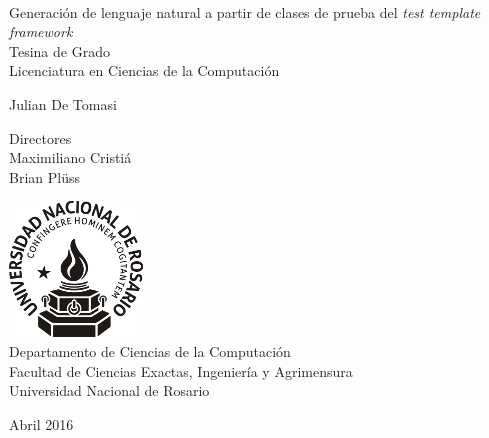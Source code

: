 \documentclass[spanish,11pt,a4paper]{memoir} %
\begin{document}
 

%
%
\thispagestyle{empty}

{%
\sffamily
\centering
\Large

~\vspace{\fill}

{\huge 
Generación de lenguaje natural a partir de clases de prueba del \textit{test template framework}
}\\[0.6em]
Tesina de Grado\\
Licenciatura en Ciencias de la Computación

\vspace{1.5cm}

{\LARGE
Julian De Tomasi
}

\vspace{1.5cm}

{\tiny Directores}\\
Maximiliano Cristiá\\
Brian Plüss\\

\vspace{2.5cm}

\includegraphics[scale=0.8]{img/unr.png}\\
Departamento de Ciencias de la Computación\\
Facultad de Ciencias Exactas, Ingeniería y Agrimensura\\
Universidad Nacional de Rosario

\vspace{\fill}

Abril 2016

}%

\cleardoublepage


\tableofcontents

\cleardoublepage
\listoffigures

\cleardoublepage
\listofalgorithms
{}













\appendix






\end{document}
